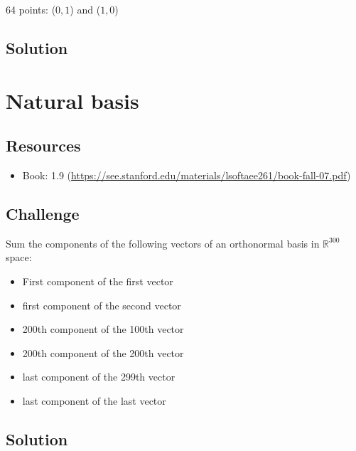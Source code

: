 64 points:
($0, 1$) and ($1, 0$)

\subsection*{Solution}
\six{}


\timebox




\newpage
\section{Natural basis}

\subsection*{Resources}
\begin{itemize}
    \item Book: 1.9 (\url{https://see.stanford.edu/materials/lsoftaee261/book-fall-07.pdf})
\end{itemize}

\subsection*{Challenge}
Sum the components of the following vectors of an orthonormal basis in $\mathbb{R}^{300}$ space:

\begin{itemize}
    \item First component of the first vector
    \item first component of the second vector
    \item 200th component of the 100th vector
    \item 200th component of the 200th vector
    \item last component of the 299th vector
    \item last component of the last vector
\end{itemize}

\subsection*{Solution}
\six{}


\timebox




\newpage
